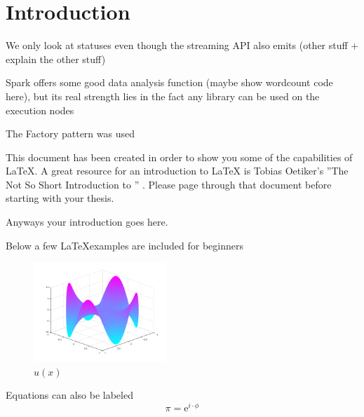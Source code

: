 \chapter{Introduction}

We only look at statuses even though the streaming API also emits (other stuff + explain the other stuff)

Spark offers some good data analysis function (maybe show wordcount code here), but its real strength lies in the fact any library can be used on the execution nodes

The Factory pattern was used

\label{chapter:Introduction}
This document has been created in order to show you some of the capabilities
of \LaTeX. A great resource for an introduction to \LaTeX\xspace is Tobias
Oetiker's ''The Not So Short Introduction to \LaTeXe'' \cite{latex}. Please
page through that document
before starting with your thesis.
\par
Anyways your introduction goes here.


Below a few \LaTeX examples are included for beginners
\begin{figure}[ht]
    \centering
    \includegraphics[width=5cm]{images/swing_function_plot.png}
    \caption{$u(x)$}%
    \label{fig:swingPlot}
\end{figure}


Equations can also be labeled
\begin{equation}
    \pi = \mathrm{e}^{i\cdot\phi}
    \label{eq:equation1}
\end{equation}


